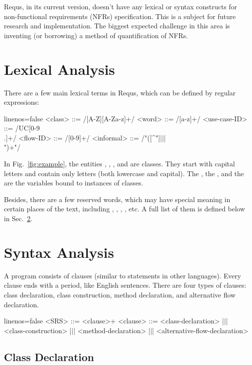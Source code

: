 \documentclass[sigplan,10pt]{acmart}
\begin{document}
Requs, in its current version, doesn't have any lexical or syntax constructs
for non-functional requirements (NFRs) specification. This is a subject for
future research and implementation. The biggest expected challenge in this area is
inventing (or borrowing) a method of quantification of NFRs.

\section{Lexical Analysis}
\label{sec:lexical}

There are a few main lexical terms in Requs, which can be
defined by regular expressions:

\begin{ffcode*}{linenos=false}
<class> ::= /[A-Z][A-Za-z]+/
<word> ::= /[a-z]+/
<use-case-ID> ::= /UC[0-9\\.]+/
<flow-ID> ::= /[0-9]+/
<informal> ::= /"([^"]|$\vert$|\\")+"/
\end{ffcode*}

In Fig.~\ref{fig:example}, the entities , , , and
 are classes. They start with capital letters and contain only
letters (both lowercase and capital). The , the , and
the  are the variables bound to instances of classes.

Besides, there are a few reserved words, which may have special meaning in
certain places of the text, including , , ,
, etc.
A full list of them is defined below in Sec.~\ref{sec:syntax}.

\section{Syntax Analysis}
\label{sec:syntax}

A program consists of clauses (similar to statements in other
languages). Every clause ends with a period, like English sentences. There
are four types of clauses: class declaration, class construction, method
declaration, and alternative flow declaration.

\begin{ffcode*}{linenos=false}
<SRS> ::= <clause>+
<clause> ::= <class-declaration>
  |$\vert$| <class-construction>
  |$\vert$| <method-declaration>
  |$\vert$| <alternative-flow-declaration>
\end{ffcode*}

\subsection{Class Declaration}
\end{document}
